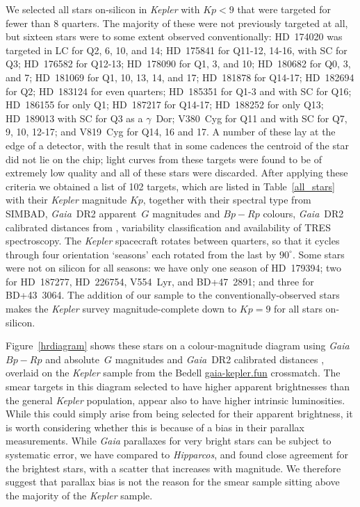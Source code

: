 \documentclass[a4paper,fleqn,usenatbib]{mnras}
\newcommand{\kepler}{\textit{Kepler}\xspace}
\newcommand{\hipparcos}{\textit{Hipparcos}\xspace}
\newcommand{\gaia}{\textit{Gaia}\xspace}
\begin{document}
We selected all stars on-silicon in \kepler with $Kp<9$ that were targeted for fewer than $8$ quarters. The majority of these were not previously targeted at all, but sixteen stars were to some extent observed conventionally: HD~174020 was targeted in LC for Q2, 6, 10, and 14; HD~175841 for Q11-12, 14-16, with SC for Q3; HD~176582 for Q12-13; HD~178090 for Q1, 3, and 10; HD~180682 for Q0, 3, and 7; HD~181069 for Q1, 10, 13, 14, and 17; HD~181878 for Q14-17; HD~182694 for Q2; HD~183124 for even quarters; HD~185351 for Q1-3 and with SC for Q16; HD~186155 for only Q1; HD~187217 for Q14-17; HD~188252 for only Q13; HD~189013 with SC for Q3 as a $\gamma$~Dor; V380~Cyg for Q11 and with SC for Q7, 9, 10, 12-17; and V819~Cyg for Q14, 16 and 17. A number of these lay at the edge of a detector, with the result that in some cadences the centroid of the star did not lie on the chip; light curves from these targets were found to be of extremely low quality and all of these stars were discarded. After applying these criteria we obtained a list of 102 targets, which are listed in Table~\ref{all_stars} with their \kepler magnitude $Kp$, together with their spectral type from SIMBAD, \gaia~DR2 apparent~$G$ magnitudes and $Bp-Rp$ colours, \gaia~DR2 calibrated distances from \citet{gaiadists}, variability classification and availability of TRES spectroscopy. The \kepler spacecraft rotates between quarters, so that it cycles through four orientation `seasons' each rotated from the last by $90^{\circ}$. Some stars were not on silicon for all seasons: we have only one season of HD~179394; two for HD~187277, HD~226754, V554~Lyr, and BD+47~2891; and three for BD+43~3064. The addition of our sample to the conventionally-observed stars makes the \kepler survey magnitude-complete down to $Kp=9$ for all stars on-silicon.

Figure~\ref{hrdiagram} shows these stars on a colour-magnitude diagram using \gaia $Bp-Rp$ and absolute~$G$ magnitudes and \gaia~DR2 calibrated distances \citep{gaiadists}, overlaid on the \kepler sample from the Bedell \url{gaia-kepler.fun} crossmatch. The smear targets in this diagram selected to have higher apparent brightnesses than the general \kepler population, appear also to have higher intrinsic luminosities. While this could simply arise from being selected for their apparent brightness, it is {}worth considering whether this is because of a bias in their parallax measurements. While \gaia parallaxes for very bright stars can be subject to systematic error, we have compared to \hipparcos \citep{vanleeuwen07b}, and found close agreement for the brightest stars, with a scatter that increases with magnitude. We therefore suggest that parallax bias is not the reason for the smear sample sitting above the majority of the \kepler sample.
\end{document}
